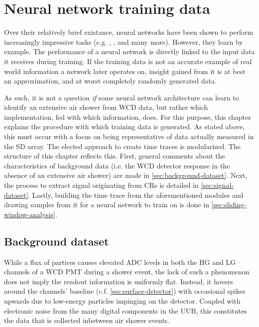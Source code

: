 
\chapter{Neural network training data}
\label{chap:neural-network-data}

Over their relatively brief existance, neural networks have been shown to perform increasingly impressive tasks (e.g.  \cite{openai2019dota}, \cite{openai2023gpt4}, 
and many more). However, they learn by example. The performance of a neural network is directly linked to the input data it receives during training. If the 
training data is not an accurate example of real world information a network later operates on, insight gained from it is at best an approximation, and at worst
completely randomly generated data. 

As such, it is not a question \textit{if} some neural network architecture can learn to identify an extensive air shower from WCD data, but rather which 
implementation, fed with which information, does. For this purpose, this chapter explains the procedure with which training data is generated. As stated above, this
must occur with a focus on being representative of data actually measured in the SD array. The elected approach to create time traces is modularized. The structure
of this chapter reflects this. First, general comments about the characteristics of background data (i.e. the WCD detector response in the absence of an extensive 
air shower) are made in \autoref{sec:background-dataset}. Next, the process to extract signal originating from CRs is detailed in \autoref{sec:signal-dataset}.
Lastly, building the time trace from the aforementioned modules and drawing samples from it for a neural network to train on is done in 
\autoref{sec:sliding-window-analysis}.

\section{Background dataset}
\label{sec:background-dataset}

While a flux of partices causes elevated ADC levels in both the HG and LG channels of a WCD PMT during a shower event, the lack of such a phenomenon does not imply 
the readout information is uniformly flat. Instead, it hovers around the channels' baseline (c.f. \autoref{sec:surface-detector}) with occasional spikes upwards 
due to low-energy particles impinging on the detector. Coupled with electronic noise from the many digital components in the UUB, this constitutes the data that is 
collected inbetween air shower events.

